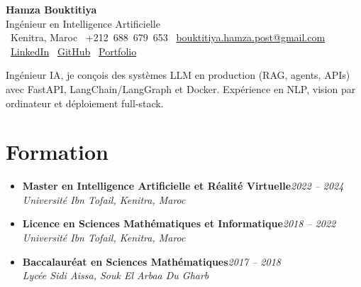 \documentclass[10pt,a4paper]{article}
\newcommand{\cvname}[1]{{\Huge\bfseries\color{ink}#1}}
\newcommand{\cvtitle}[1]{{\large\color{muted}#1}}
\newcommand{\cvmeta}[1]{{\footnotesize\color{muted}#1}}
\newcommand{\role}[2]{\textbf{#1}\hfill\textit{\color{muted}#2}\\}
\newcommand{\org}[1]{\textit{#1}\\[0.5pt]}
\begin{document}
\normalsize
\setlength{\tabcolsep}{0pt}

\begin{center}
    \cvname{Hamza Bouktitiya}\\[2pt]
    \cvtitle{Ingénieur en Intelligence Artificielle}\\[4pt]
    \cvmeta{%
        \faMapMarker*\ Kenitra, Maroc
        \quad\textbullet\quad
        \faPhone*\ +212~688~679~653
        \quad\textbullet\quad
        \faEnvelope*\ \href{mailto:bouktitiya.hamza.post@gmail.com}{bouktitiya.hamza.post@gmail.com}
    }\\[2pt]
    \cvmeta{%
        \faLinkedin*\ \href{https://www.linkedin.com/in/hamza-bouktitiya-604471253/}{LinkedIn}
        \quad\textbullet\quad
        \faGithub*\ \href{https://github.com/gothamza}{GitHub}
        \quad\textbullet\quad
        \faGlobe*\ \href{https://gothamza.github.io/portfolio/}{Portfolio}
    }
\end{center}

\vspace{1pt}
{\footnotesize\color{ink}
Ingénieur IA, je conçois des systèmes LLM en production (RAG, agents, APIs) avec FastAPI, LangChain/LangGraph et Docker. Expérience en NLP, vision par ordinateur et déploiement full-stack.}

\section*{Formation}
\begin{itemize}
    \item \role{Master en Intelligence Artificielle et Réalité Virtuelle}{2022 -- 2024}
          \org{Université Ibn Tofail, Kenitra, Maroc}

    \item \role{Licence en Sciences Mathématiques et Informatique}{2018 -- 2022}
          \org{Université Ibn Tofail, Kenitra, Maroc}

    \item \role{Baccalauréat en Sciences Mathématiques}{2017 -- 2018}
          \org{Lycée Sidi Aissa, Souk El Arbaa Du Gharb}
\end{itemize}

\end{document}
